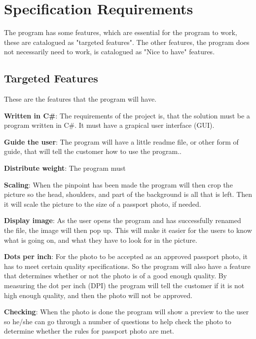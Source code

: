 \section{Specification Requirements}
\label{sec:Spec}
The program has some features, which are essential for the program to work, these are catalogued as "targeted features". The other features, the program does not necessarily need to work, is catalogued as "Nice to have" features.
\newline

\subsection{Targeted Features}
These are the features that the program will have. 


\textbf{Written in C\#}:
The requirements of the project is, that the solution must be a program written in C\#. It must have a grapical user interface (GUI).

\textbf{Guide the user}:
The program will have a little readme file, or other form of guide, that will tell the customer how to use the program..
\newline

\textbf{Distribute weight}:
The program must 
\newline

\textbf{Scaling}:
When the pinpoint has been made the program will then crop the picture so the head, shoulders, and part of the background is all that is left. Then it will scale the picture to the size of a passport photo, if needed.
\newline

\textbf{Display image}:
As the user opens the program and has successfully renamed the file, the image will then pop up. This will make it easier for the users to know what is going on, and what they have to look for in the picture.
\newline

\textbf{Dots per inch}:
For the photo to be accepted as an approved passport photo, it has to meet certain quality specifications. So the program will also have a feature that determines whether or not the photo is of a good enough quality. By measuring the dot per inch (DPI) the program will tell the customer if it is not high enough quality, and then the photo will not be approved.
\newline

\textbf{Checking}:
When the photo is done the program will show a preview to the user so he/she can go through a number of questions to help check the photo to determine whether the rules for passport photo are met.
\newline

